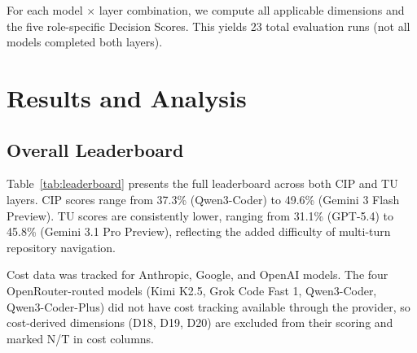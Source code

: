 \documentclass[10pt,twocolumn]{article}
\begin{document}
For each model $\times$ layer combination, we compute all applicable dimensions and the five role-specific Decision Scores. This yields 23 total evaluation runs (not all models completed both layers).

\section{Results and Analysis}
\label{sec:analysis}

\subsection{Overall Leaderboard}
\label{sec:leaderboard}

Table~\ref{tab:leaderboard} presents the full leaderboard across both CIP and TU layers. CIP scores range from 37.3\% (Qwen3-Coder) to 49.6\% (Gemini 3 Flash Preview). TU scores are consistently lower, ranging from 31.1\% (GPT-5.4) to 45.8\% (Gemini 3.1 Pro Preview), reflecting the added difficulty of multi-turn repository navigation.

Cost data was tracked for Anthropic, Google, and OpenAI models. The four OpenRouter-routed models (Kimi K2.5, Grok Code Fast 1, Qwen3-Coder, Qwen3-Coder-Plus) did not have cost tracking available through the provider, so cost-derived dimensions (D18, D19, D20) are excluded from their scoring and marked N/T in cost columns.
\end{document}
